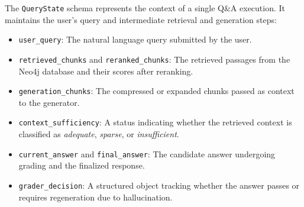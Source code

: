 The \texttt{QueryState} schema represents the context of a single Q\&A execution. It maintains the user's query and intermediate retrieval and generation steps:
\begin{itemize}
    \item \texttt{user\_query}: The natural language query submitted by the user.
    \item \texttt{retrieved\_chunks} and \texttt{reranked\_chunks}: The retrieved passages from the Neo4j database and their scores after reranking.
    \item \texttt{generation\_chunks}: The compressed or expanded chunks passed as context to the generator.
    \item \texttt{context\_sufficiency}: A status indicating whether the retrieved context is classified as \emph{adequate}, \emph{sparse}, or \emph{insufficient}.
    \item \texttt{current\_answer} and \texttt{final\_answer}: The candidate answer undergoing grading and the finalized response.
    \item \texttt{grader\_decision}: A structured object tracking whether the answer passes or requires regeneration due to hallucination.
\end{itemize}

\begin{table}[H]
\centering
\caption{Builder Pipeline Components and Implementation Files}
\label{tab:builder_components}
\end{table}

